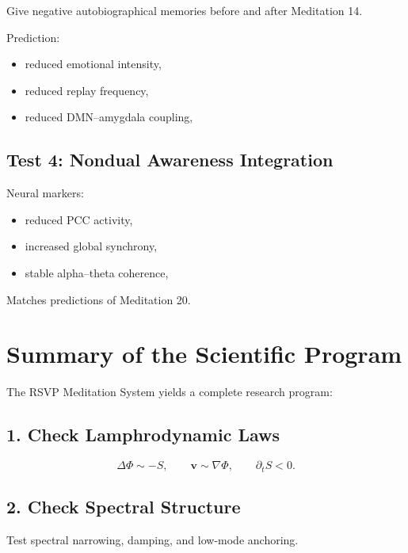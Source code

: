 \documentclass[12pt]{article}
\begin{document}
Give negative autobiographical memories before and after Meditation 14.

Prediction:

\begin{itemize}
    \item reduced emotional intensity,
    \item reduced replay frequency,
    \item reduced DMN--amygdala coupling,
\end{itemize}

\section{Test 4: Nondual Awareness Integration}

Neural markers:

\begin{itemize}
    \item reduced PCC activity,
    \item increased global synchrony,
    \item stable alpha--theta coherence,
\end{itemize}

Matches predictions of Meditation 20.

\newpage


\chapter{Summary of the Scientific Program}

The RSVP Meditation System yields a complete research program:

\section{1. Check Lamphrodynamic Laws}

\[
\Delta\Phi \sim -S,\qquad \mathbf{v}\sim\nabla\Phi,\qquad \partial_t S<0.
\]

\section{2. Check Spectral Structure}

Test spectral narrowing, damping, and low-mode anchoring.
\end{document}
